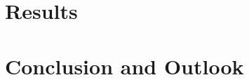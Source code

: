 \documentclass{reporter}
\begin{document}
\section{Results}


\section{Conclusion and Outlook}





%
%
%
%
%
%
%
\end{document}
